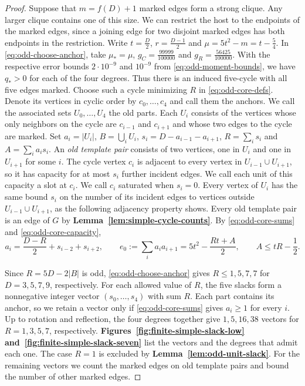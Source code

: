 \documentclass[preprint,11pt,numbers]{elsarticle-arxiv}
\numberwithin{equation}{section}
\theoremstyle{definition}
\begin{document}
\begin{proof}
Suppose that $m=f(D)+1$ marked edges form a strong clique. Any larger clique contains one of this size.
We can restrict the host to the endpoints of the marked edges, since
a joining edge for two disjoint marked edges has both endpoints in
the restriction. Write $t=\frac D2$, $r=\frac{D-1}{2}$ and
$\mu=5t^2-m=t-\frac54$. In \eqref{eq:odd-choose-anchor}, take
$\mu_*=\mu$, $g_C=\frac{99999}{100000}$ and $g_R=\frac{56425}{100000}$.
With the respective error bounds $2\cdot10^{-9}$ and $10^{-9}$ from
\eqref{eq:odd-moment-bounds}, we have $q_*>0$ for each of the four
degrees. Thus there is an induced five-cycle with all five edges marked.
Choose such a cycle minimizing $R$ in \eqref{eq:odd-core-defs}.
Denote its vertices in cyclic
order by $c_0,\ldots,c_4$ and call them the anchors. We call the
associated sets $U_0,\ldots,U_4$ the old parts. Each $U_i$ consists of the vertices whose
only neighbors on the cycle are $c_{i-1}$ and $c_{i+1}$ and whose two
edges to the cycle are marked. Set $a_i=|U_i|$, $B=\bigcup_i U_i$,
$s_i=D-a_{i-1}-a_{i+1}$, $R=\sum_i s_i$ and $A=\sum_i a_is_i$.
An \emph{old template pair} consists of two vertices, one in $U_i$
and one in $U_{i+1}$ for some $i$. The cycle vertex $c_i$ is
adjacent to every vertex in $U_{i-1}\cup U_{i+1}$, so it has
capacity for at most $s_i$ further incident edges. We call each
unit of this capacity a slot at $c_i$. We call $c_i$ saturated
when $s_i=0$. Every vertex of $U_i$ has the same bound $s_i$ on the
number of its incident edges to vertices outside $U_{i-1}\cup U_{i+1}$,
as the following adjacency property shows.
Every old template pair is an edge of $G$ by \textbf{Lemma~\ref{lem:simple-cycle-counts}}. By \eqref{eq:odd-core-sums}
and \eqref{eq:odd-core-capacity},
\[
 a_i=\frac{D-R}{2}+s_{i-2}+s_{i+2},\qquad
 e_0:=\sum_i a_i a_{i+1}=5t^2-\frac{Rt+A}{2},\qquad
 A\leq tR-\frac{1}{2}.
\]

Since $R=5D-2|B|$ is odd, \eqref{eq:odd-choose-anchor} gives
$R\leq1,5,7,7$ for $D=3,5,7,9$, respectively.
For each allowed value of $R$, the five slacks form a nonnegative
integer vector $(s_0,\ldots,s_4)$ with sum $R$. Each part contains
its anchor, so we retain a vector only if \eqref{eq:odd-core-sums}
gives $a_i\geq1$ for every $i$. Up to rotation and reflection,
the four degrees together give $1,5,16,38$ vectors for
$R=1,3,5,7$, respectively.
\textbf{Figures~\ref{fig:finite-simple-slack-low}
and~\ref{fig:finite-simple-slack-seven}} list the vectors and the degrees
that admit each one. The case $R=1$ is excluded by
\textbf{Lemma~\ref{lem:odd-unit-slack}}. For the remaining vectors we
count the marked edges on old template pairs and bound the number
of other marked edges.


\end{proof}
\end{document}
